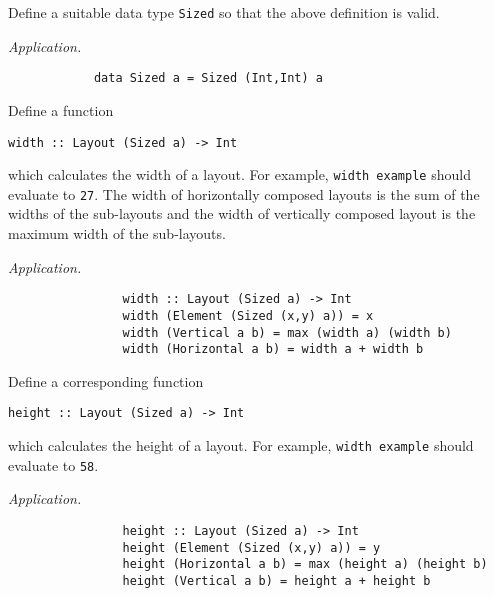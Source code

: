 \begin{parts}
	\begin{subparts}
		\subpart[2] Define a suitable data type \texttt{\small Sized} so that the above definition is valid. \droppoints
		
		\begin{solution}
			\emph{Application.}
			\begin{verbatim}
			data Sized a = Sized (Int,Int) a
			\end{verbatim}
		\end{solution}
	
		\subpart[4] Define a function 
		\begin{center}
			\texttt{\small width~::~Layout (Sized a) -> Int}
		\end{center}
		which calculates the width of a layout. For example, \texttt{\small width example} should evaluate to \texttt{\small 27}. The width of horizontally composed layouts is the sum of the widths of the sub-layouts and the width of vertically composed layout is the maximum width of the sub-layouts.  \droppoints
		
		\begin{solution}
			\emph{Application.} 
			\begin{verbatim}
				width :: Layout (Sized a) -> Int
				width (Element (Sized (x,y) a)) = x 
				width (Vertical a b) = max (width a) (width b)
				width (Horizontal a b) = width a + width b
			\end{verbatim}
		\end{solution}
	
		\subpart[4] Define a corresponding function
		\begin{center}
			\texttt{\small height~::~Layout (Sized a) -> Int}
		\end{center}
		which calculates the height of a layout. For example, \texttt{\small width example} should evaluate to \texttt{\small 58}. \droppoints
		
		\begin{solution}
			\emph{Application.} 
			\begin{verbatim}
				height :: Layout (Sized a) -> Int
				height (Element (Sized (x,y) a)) = y 
				height (Horizontal a b) = max (height a) (height b)
				height (Vertical a b) = height a + height b
			\end{verbatim}
		\end{solution} 
	

\end{subparts}
\end{parts}
